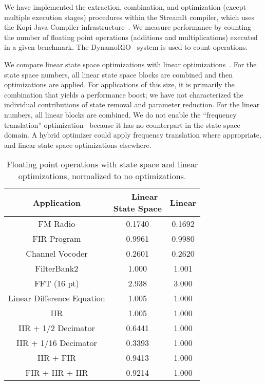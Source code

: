 \label{sec:results}

We have implemented the extraction, combination, and optimization
(except multiple execution stages) procedures within the StreamIt
compiler, which uses the Kopi Java Compiler
infrastructure~\cite{kopi}. We measure performance by counting the
number of floating point operations (additions and multiplications)
executed in a given benchmark. The DynamoRIO~\cite{dynamo} system is
used to count operations.

We compare linear state space optimizations with linear
optimizations~\cite{Lamb}.  For the state space numbers, all linear
state space blocks are combined and then optimizations are applied.
For applications of this size, it is primarily the combination that
yields a performance boost; we have not characterized the individual
contributions of state removal and parameter reduction.  For the
linear numbers, all linear blocks are combined.  We do not enable the
``frequency translation'' optimization~\cite{Lamb} because it has no
counterpart in the state space domain.  A hybrid optimizer could apply
frequency translation where appropriate, and linear state space
optimizations elsewhere.

\begin{table}[tbp]
\small
\begin{center}
\begin{tabular} {c|c|c}
{\bf Application} & \parbox{0.7in}{{\bf ~~~Linear} \\ {\bf State Space}} & {\bf Linear} \\ \hline
FM Radio & 0.1740 & 0.1692 \\
FIR Program &  0.9961 & 0.9980 \\
Channel Vocoder & 0.2601 & 0.2620 \\
FilterBank2 & 1.000 & 1.001 \\
FFT (16 pt) & 2.938 & 3.000 \\
Linear Difference Equation & 1.005 & 1.000 \\
IIR & 1.005 & 1.000 \\
IIR + 1/2 Decimator & 0.6441 & 1.000 \\
IIR + 1/16 Decimator & 0.3393 & 1.000 \\
IIR + FIR & 0.9413 & 1.000 \\
FIR + IIR + IIR & 0.9214 & 1.000
\end{tabular}
\caption{Floating point operations with state space and linear
optimizations, normalized to no optimizations.\protect\label{tab:results}}
\end{center}
\vspace{-18pt}
\end{table}

